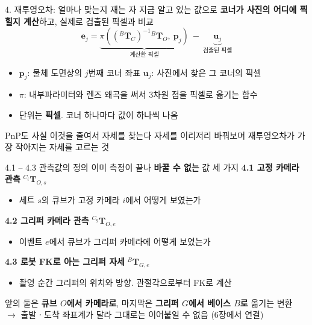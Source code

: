 \documentclass[aspectratio=169,11pt]{beamer}
\newcommand{\T}[3][]{{}^{#2}\mathbf{T}^{#1}_{#3}}   %
\begin{document}
\begin{frame}{4. 재투영오차: 얼마나 맞는지 재는 자}
  지금 알고 있는 값으로 \textbf{코너가 사진의 어디에 찍힐지 계산}하고,
  실제로 검출된 픽셀과 비교
  \[
    \mathbf{e}_j
    =
    \underbrace{
      \pi\!\left(\left(\T{B}{C}\right)^{-1}\T{B}{O},\ \mathbf{p}_j\right)
    }_{\text{계산한 픽셀}}
    \ -\
    \underbrace{\mathbf{u}_j}_{\text{검출된 픽셀}}
  \]
  \begin{itemize}
    \item $\mathbf{p}_j$: 물체 도면상의 $j$번째 코너 좌표
      \quad $\mathbf{u}_j$: 사진에서 찾은 그 코너의 픽셀
    \item $\pi$: 내부파라미터와 렌즈 왜곡을 써서 $3$차원 점을 픽셀로 옮기는 함수
    \item 단위는 \textbf{픽셀}. 코너 하나마다 값이 하나씩 나옴
  \end{itemize}
  \vfill
  \begin{block}{PnP도 사실 이것을 줄여서 자세를 찾는다}
    자세를 이리저리 바꿔보며 재투영오차가 가장 작아지는 자세를 고르는 것
  \end{block}
\end{frame}

\begin{frame}{4.1 -- 4.3 관측값의 정의}
  이미 측정이 끝나 \textbf{바꿀 수 없는} 값 세 가지
  \vfill
  \textbf{4.1 고정 카메라 관측} \hfill $\T{C_i}{O,s}$
  \vspace{-1mm}
  \begin{itemize}
    \item 세트 $s$의 큐브가 고정 카메라 $i$에서 어떻게 보였는가
  \end{itemize}
  \vfill
  \textbf{4.2 그리퍼 카메라 관측} \hfill $\T{C_g}{O,e}$
  \vspace{-1mm}
  \begin{itemize}
    \item 이벤트 $e$에서 큐브가 그리퍼 카메라에 어떻게 보였는가
  \end{itemize}
  \vfill
  \textbf{4.3 로봇 FK로 아는 그리퍼 자세} \hfill $\T{B}{G,e}$
  \vspace{-1mm}
  \begin{itemize}
    \item 촬영 순간 그리퍼의 위치와 방향. 관절각으로부터 FK로 계산
  \end{itemize}
  \vfill
  \begin{block}{}
    \centering
    앞의 둘은 \textbf{큐브 $O$에서 카메라로}, 마지막은
    \textbf{그리퍼 $G$에서 베이스 $B$로} 옮기는 변환\\
    $\rightarrow$ 출발ㆍ도착 좌표계가 달라 그대로는 이어붙일 수 없음 (6장에서 연결)
  \end{block}
\end{frame}
\end{document}
